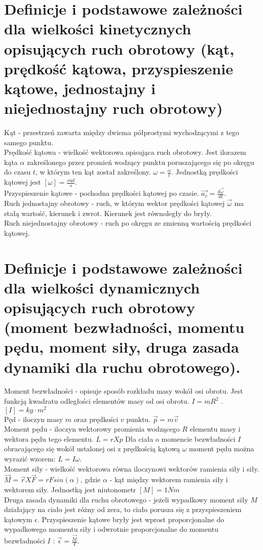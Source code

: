 \documentclass[a4paper,11pt]{article} %
\begin{document}
\section{ Definicje i podstawowe zależności dla wielkości kinetycznych opisujących
ruch obrotowy (kąt, prędkość kątowa, przyspieszenie kątowe, jednostajny i
niejednostajny ruch obrotowy){\color{red}{Gotowe}}}
Kąt - przestrzeń zawarta między dwiema półprostymi wychodzącymi z tego samego punktu.\\
Prędkość kątowa - wielkość wektorowa opisująca ruch obrotowy. Jest ilorazem kąta $\alpha$ zakreślonego przez promień wodzący punktu poruszającego się po okręgu do czasu $t$, w którym ten kąt został zakreślony. $\omega = \frac{\alpha}{t}$. Jednostką prędkości kątowej jest $[\omega] = \frac{rad}{s}$.\\
Przyspieszenie kątowe - pochodna prędkości kątowej po czasie. $\vec{a_{r}} = \frac{d \vec{\omega}}{dt}.$\\
Ruch jednostajny obrotowy - ruch, w którym wektor prędkości kątowej $\vec{\omega}$ ma stałą wartość, kierunek i zwrot. Kierunek jest równoległy do bryły. \\
Ruch niejednostajny obrotowy - ruch po okręgu ze zmienną wartością prędkości kątowej.


\section{Definicje i podstawowe zależności dla wielkości dynamicznych opisujących
ruch obrotowy (moment bezwładności, momentu pędu, moment siły, druga
zasada dynamiki dla ruchu obrotowego).{\color{red}{Gotowe}} }
Moment bezwładności - opisuje sposób rozkładu masy wokół osi obrotu. Jest funkcją kwadratu odległości elementów masy od osi obrotu. $I = mR^2$ . $ [I] = kg \cdot m^2$\\
Pęd - iloczyn masy $m$ oraz prędkości $v$ punktu. $\vec{p} = m \vec{v}$\\
Moment pędu - iloczyn wektorowy promienia wodzącego $R$ elementu masy i wektora pędu tego elementu. $ L = r X p$ Dla ciała o momencie bezwładności $I$ obracającego się wokół ustalonej osi z prędkością kątową $\omega$ moment pędu można wyrazić wzorem: $L = I \omega$.\\
Moment siły - wielkość wektorowa równa iloczynowi wektorów ramienia siły i siły. $ \vec{M} = \vec{r} X \vec{F} = r F sin(\alpha)$, gdzie $\alpha$ - kąt między wektorem ramienia siły i wektorem siły. Jednostką jest niutonometr $[M] = 1 Nm$ \\
Druga zasada dynamiki dla ruchu obrotowego - jeżeli wypadkowy moment siły $M$ działający na ciało jest różny od zera, to ciało porusza się z przyspieszeniem kątowym $\epsilon$. Przyspieszenie kątowe bryły jest wprost proporcjonalne do wypadkowego momentu siły i odwrotnie proporcjonalne do momentu bezwładności $I$ : $\vec{\epsilon} = \frac{\vec{M}}{I}$.
\end{document}
